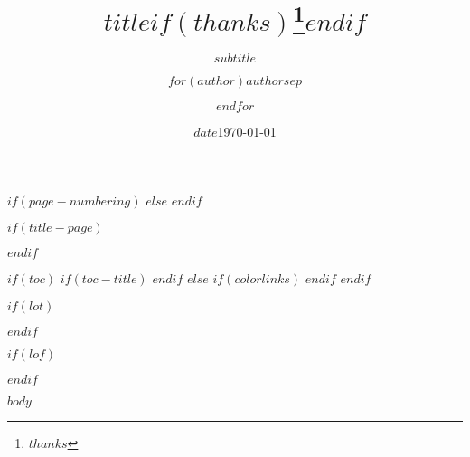 \documentclass[
$if(page-size)$
  $page-size$paper,
$else$
  a4paper,
$endif$
$if(fontsize)$
  $font-size$,
$else$
  10pt,
$endif$
$if(lang)$
  $babel-lang$,
$endif$
$if(draft)$
  draft,
$endif$
  parskip=half
]{scrartcl}
\title{$title$$if(thanks)$\thanks{$thanks$}$endif$}
\subtitle{$subtitle$}
\author{$for(author)$$author$$sep$ \and $endfor$}
\date{$date$}
\date{\today}
\begin{document}
$if(page-numbering)$
$else$
$endif$

$if(title-page)$
  \maketitle
  \pagebreak
$endif$

$if(toc)$
  $if(toc-title)$
    \renewcommand*\contentsname{$toc-title$}
  $endif$
  $else$
  {
    $if(colorlinks)$
      \hypersetup{linkcolor=$if(toccolor)$$toccolor$$else$$endif$}
    $endif$
  \setcounter{tocdepth}{$toc-depth$}
  \tableofcontents
  }
  \pagebreak
$endif$


$if(lot)$
\listoftables
$endif$

$if(lof)$
\listoffigures
$endif$

$body$
\end{document}
